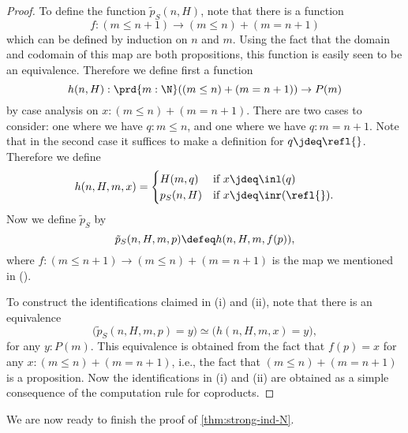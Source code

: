 \begin{proof}
  To define the function $\tilde{p}_S(n,H)$, note that there is a function
  \begin{equation*}
    f : (m\leq n+1)\to (m\leq n)+(m=n+1)\tag{\textasteriskcentered}
  \end{equation*}
  which can be defined by induction on $n$ and $m$. Using the fact that the domain and codomain of this map are both propositions, this function is easily seen to be an equivalence. Therefore we define first a function
  \begin{equation*}
    h(n,H) :\prd{m:\N} ((m\leq n)+(m=n+1))\to P(m)
  \end{equation*}
  by case analysis on $x:(m\leq n)+(m=n+1)$. There are two cases to consider: one where we have $q:m\leq n$, and one where we have $q:m=n+1$. Note that in the second case it suffices to make a definition for $q\jdeq \refl{}$. Therefore we define
  \begin{equation*}
    h(n,H,m,x) =
    \begin{cases}
      H(m,q) & \text{if }x\jdeq\inl(q)\\
      p_S(n,H) & \text{if }x\jdeq\inr(\refl{}).
    \end{cases}
  \end{equation*}
  Now we define $\tilde{p}_S$ by
  \begin{equation*}
    \tilde{p}_S(n,H,m,p)\defeq h(n,H,m,f(p)),
  \end{equation*}
  where $f:(m\leq n+1)\to (m\leq n)+(m=n+1)$ is the map we mentioned in (\textasteriskcentered).
  
  To construct the identifications claimed in (i) and (ii), note that there is an equivalence
  \begin{equation*}
    \big(\tilde{p}_S(n,H,m,p)=y\big)\simeq \big(h(n,H,m,x)=y\big),
  \end{equation*}
  for any $y:P(m)$. This equivalence is obtained from the fact that $f(p)=x$ for any $x:(m\leq n)+(m=n+1)$, i.e., the fact that $(m\leq n)+(m=n+1)$ is a proposition. Now the identifications in (i) and (ii) are obtained as a simple consequence of the computation rule for coproducts.
\end{proof}

We are now ready to finish the proof of \cref{thm:strong-ind-N}.

